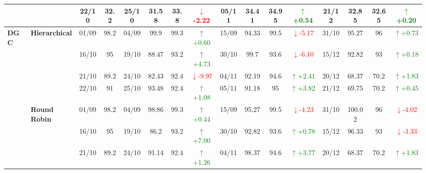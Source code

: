 {\begin{longtable}{llcc|cccc|cccc|cccc}
&
& 22/10 & 32.2 & 25/10 & 31.58 & 33.8 & \textcolor{red}{\(\downarrow\)-2.22} & 05/11 & 34.41 & 34.95 & \textcolor{green}{\(\uparrow\)+0.54} & 21/12 & 32.85 & 32.65 & \textcolor{green}{\(\uparrow\)+0.20} \\
\midrule




\multirow{12}{*}{\textbf{DGC}} 
& \textbf{Hierarchical}
& 01/09 & 98.2 & 04/09 & 99.9 & 99.3 & \textcolor{green}{\(\uparrow\)+0.60} & 15/09 & 94.33 & 99.5 & \textcolor{red}{\(\downarrow\)-5.17} & 31/10 & 95.27 & 96 & \textcolor{green}{\(\uparrow\)+0.73} \\

&
& 16/10 & 95 & 19/10 & 88.47 & 93.2 & \textcolor{green}{\(\uparrow\)+4.73} & 30/10 & 99.7 & 93.6 & \textcolor{red}{\(\downarrow\)-6.10} & 15/12 & 92.82 & 93 & \textcolor{green}{\(\uparrow\)+0.18} \\

&
& 21/10 & 89.2 & 24/10 & 82.43 & 92.4 & \textcolor{red}{\(\downarrow\)-9.97} & 04/11 & 92.19 & 94.6 & \textcolor{green}{\(\uparrow\)+2.41} & 20/12 & 68.37 & 70.2 & \textcolor{green}{\(\uparrow\)+1.83} \\

&
& 22/10 & 91 & 25/10 & 93.48 & 92.4 & \textcolor{green}{\(\uparrow\)+1.08} & 05/11 & 91.18 & 95 & \textcolor{green}{\(\uparrow\)+3.82} & 21/12 & 69.75 & 70.2 & \textcolor{green}{\(\uparrow\)+0.45} \\
\cmidrule(lr){2-16}


& \textbf{Round Robin}
& 01/09 & 98.2 & 04/09 & 98.86 & 99.3 & \textcolor{green}{\(\uparrow\)+0.44} & 15/09 & 95.27 & 99.5 & \textcolor{red}{\(\downarrow\)-4.23} & 31/10 & 100.02 & 96 & \textcolor{red}{\(\downarrow\)-4.02} \\

&
& 16/10 & 95 & 19/10 & 86.2 & 93.2 & \textcolor{green}{\(\uparrow\)+7.00} & 30/10 & 92.82 & 93.6 & \textcolor{green}{\(\uparrow\)+0.78} & 15/12 & 96.33 & 93 & \textcolor{red}{\(\downarrow\)-3.33} \\

&
& 21/10 & 89.2 & 24/10 & 91.14 & 92.4 & \textcolor{green}{\(\uparrow\)+1.26} & 04/11 & 98.37 & 94.6 & \textcolor{green}{\(\uparrow\)+3.77} & 20/12 & 68.37 & 70.2 & \textcolor{green}{\(\uparrow\)+1.83} \\


\end{longtable}}
